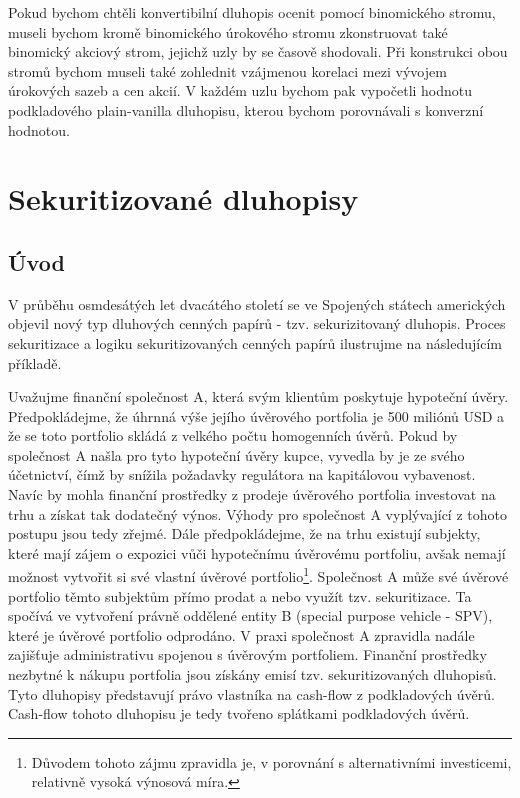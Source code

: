 \documentclass[a4paper]{book}
\begin{document}
Pokud bychom chtěli konvertibilní dluhopis ocenit pomocí binomického stromu, museli bychom kromě binomického úrokového stromu zkonstruovat také binomický akciový strom, jejichž uzly by se časově shodovali. Při konstrukci obou stromů bychom museli také zohlednit vzájmenou korelaci mezi vývojem úrokových sazeb a cen akcií. V každém uzlu bychom pak vypočetli hodnotu podkladového plain-vanilla dluhopisu, kterou bychom porovnávali s konverzní hodnotou.

\chapter{Sekuritizované dluhopisy}

\section{Úvod}

V průběhu osmdesátých let dvacátého století se ve Spojených státech amerických objevil nový typ dluhových cenných papírů - tzv. sekurizitovaný dluhopis. Proces sekuritizace a logiku sekuritizovaných cenných papírů ilustrujme na následujícím příkladě.

Uvažujme finanční společnost A, která svým klientům poskytuje hypoteční úvěry. Předpokládejme, že úhrnná výše jejího úvěrového portfolia je 500 miliónů USD a že se toto portfolio skládá z velkého počtu homogenních úvěrů. Pokud by společnost A našla pro tyto hypoteční úvěry kupce, vyvedla by je ze svého účetnictví, čímž by snížila požadavky regulátora na kapitálovou vybavenost. Navíc by mohla finanční prostředky z prodeje úvěrového portfolia investovat na trhu a získat tak dodatečný výnos. Výhody pro společnost A vyplývající z tohoto postupu jsou tedy zřejmé. Dále předpokládejme, že na trhu existují subjekty, které mají zájem o expozici vůči hypotečnímu úvěrovému portfoliu, avšak nemají možnost vytvořit si své vlastní úvěrové portfolio\footnote{Důvodem tohoto zájmu zpravidla je, v porovnání s alternativními investicemi, relativně vysoká výnosová míra.}. Společnost A může své úvěrové portfolio těmto subjektům přímo prodat a nebo využít tzv. sekuritizace. Ta spočívá ve vytvoření právně oddělené entity B (special purpose vehicle - SPV), které je úvěrové portfolio odprodáno. V praxi společnost A zpravidla nadále zajišťuje administrativu spojenou s úvěrovým portfoliem. Finanční prostředky nezbytné k nákupu portfolia jsou získány emisí tzv. sekuritizovaných dluhopisů. Tyto dluhopisy představují právo vlastníka na cash-flow z podkladových úvěrů. Cash-flow tohoto dluhopisu je tedy tvořeno splátkami podkladových úvěrů.
\end{document}
